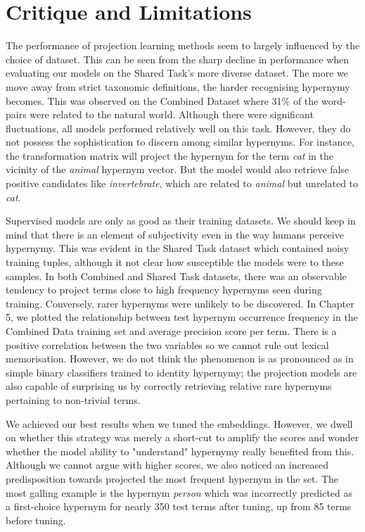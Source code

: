 \section{Critique and Limitations}
The performance of projection learning methods seem to largely influenced by the choice of dataset.  This can be seen from the sharp decline in performance when evaluating our models on the Shared Task's more diverse dataset.  The more we move away from strict taxonomic definitions, the harder recognising hypernymy becomes.  This was observed on the Combined Dataset where 31\% of the word-pairs were related to the natural world.  Although there were significant fluctuations, all models performed relatively well on this task.  However, they do not possess the sophistication to discern among similar hypernyms.  For instance, the transformation matrix will project the hypernym for the term \textit{cat} in the vicinity of the \textit{animal} hypernym vector. But the model would also retrieve false positive candidates like \textit{invertebrate}, which are related to \textit{animal} but unrelated to \textit{cat}.

Supervised models are only as good as their training datasets.  We should keep in mind that there is an element of subjectivity even in the way humans perceive hypernymy.  This was evident in the Shared Task dataset which contained noisy training tuples, although it not clear how susceptible the models were to these samples.  In both Combined and Shared Task datasets, there was an observable tendency to project terms close to high frequency hypernyms seen during training.  Conversely, rarer hypernyms were unlikely to be discovered.  In Chapter 5, we plotted the relationship between test hypernym occurrence frequency in the Combined Data training set and average precision score per term.  There is a positive correlation between the two variables so we cannot rule out lexical memorisation.  However, we do not think the phenomenon is as pronounced as in simple binary classifiers trained to identity hypernymy; the projection models are also capable of surprising us by correctly retrieving relative rare hypernyms pertaining to non-trivial terms.

We achieved our best results when we tuned the embeddings.  However, we dwell on whether this strategy was merely a short-cut to amplify the scores and wonder whether the model ability to "understand" hypernymy really benefited from this.  Although we cannot argue with higher scores, we also noticed an increased predisposition towards projected the most frequent hypernym in the set.  The most galling example is the hypernym \textit{person} which was incorrectly predicted as a first-choice hypernym for nearly 350 test terms after tuning, up from 85 terms before tuning.

